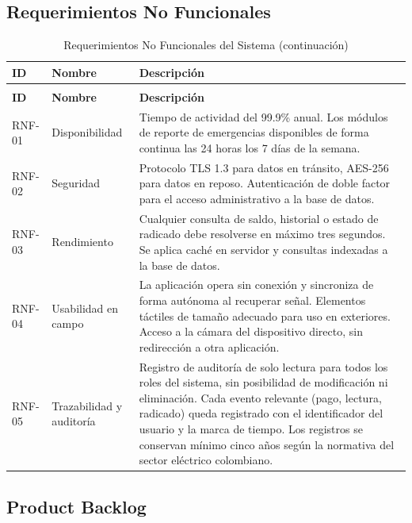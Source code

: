 \documentclass[12pt, a4paper]{article}
\begin{document}
\subsection{Requerimientos No Funcionales}

\begin{longtable}{p{1.2cm} p{3cm} p{9.5cm}}
  \caption{Requerimientos No Funcionales del Sistema} \\
  \toprule
  \textbf{ID} & \textbf{Nombre} & \textbf{Descripción} \\
  \midrule
  \endfirsthead
  \caption[]{Requerimientos No Funcionales del Sistema (continuación)} \\
  \toprule
  \textbf{ID} & \textbf{Nombre} & \textbf{Descripción} \\
  \midrule
  \endhead
  \bottomrule
  \endfoot

  RNF-01 & Disponibilidad &
    Tiempo de actividad del 99.9\% anual.
    Los módulos de reporte de emergencias disponibles de forma continua las 24 horas los 7 días de la semana. \\[4pt]

  RNF-02 & Seguridad &
    Protocolo TLS 1.3 para datos en tránsito, AES-256 para datos en reposo.
    Autenticación de doble factor para el acceso administrativo a la base de datos. \\[4pt]

  RNF-03 & Rendimiento &
    Cualquier consulta de saldo, historial o estado de radicado debe resolverse en máximo tres segundos.
    Se aplica caché en servidor y consultas indexadas a la base de datos. \\[4pt]

  RNF-04 & Usabilidad en campo &
    La aplicación opera sin conexión y sincroniza de forma autónoma al recuperar señal.
    Elementos táctiles de tamaño adecuado para uso en exteriores.
    Acceso a la cámara del dispositivo directo, sin redirección a otra aplicación. \\[4pt]

  RNF-05 & Trazabilidad y auditoría &
    Registro de auditoría de solo lectura para todos los roles del sistema, sin posibilidad de modificación ni eliminación.
    Cada evento relevante (pago, lectura, radicado) queda registrado con el identificador del usuario y la marca de tiempo.
    Los registros se conservan mínimo cinco años según la normativa del sector eléctrico colombiano. \\
\end{longtable}

\subsection{Product Backlog}
\end{document}
